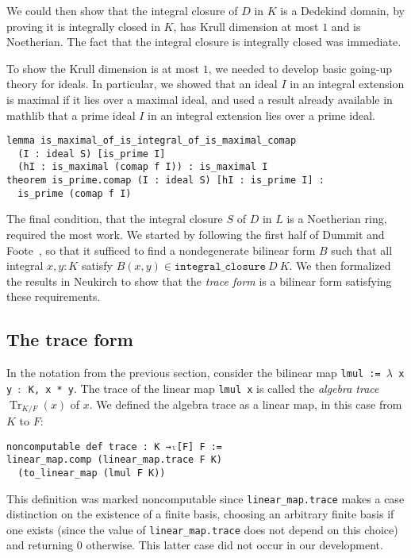 \documentclass[sn-mathphys]{sn-jnl}%
\newcommand{\lean}[1]{\texttt{#1}\xspace}
\DeclareMathOperator{\Tr}{Tr}
\newcommand{\mathlib}{\textsf{mathlib}\xspace}
\begin{document}
We could then show that the integral closure of $D$ in $K$ is a Dedekind domain,
by proving it is integrally closed in $K$, has Krull dimension at most $1$ and is Noetherian.
The fact that the integral closure is integrally closed was immediate.

To show the Krull dimension is at most $1$, we needed to develop basic going-up theory for ideals.
In particular, we showed that an ideal $I$ in an integral extension is maximal if it lies over a maximal ideal,
and used a result already available in \mathlib that a prime ideal $I$ in an integral extension lies over a prime ideal.
\begin{lstlisting}
lemma is_maximal_of_is_integral_of_is_maximal_comap
  (I : ideal S) [is_prime I]
  (hI : is_maximal (comap f I)) : is_maximal I
theorem is_prime.comap (I : ideal S) [hI : is_prime I] :
  is_prime (comap f I)
\end{lstlisting}

The final condition, that the integral closure $S$ of $D$ in $L$ is a Noetherian ring, required the most work.
We started by following the first half of Dummit and Foote~\cite[Theorem~15.29]{Dummit-and-Foote},
so that it sufficed to find a nondegenerate bilinear form $B$ such that all integral $x, y : K$ satisfy $B(x, y) \in \lean{integral\_closure}\ D\ K$.
We then formalized the results in Neukirch \cite[Sections~2.5--2.8]{Neukirch} to show that the \emph{trace form} is a bilinear form satisfying these requirements.

\subsection{The trace form}\label{sec:trace-form}
In the notation from the previous section, consider the bilinear map \lean{lmul := $\lambda$ x y $:$ K, x~*~y}.
The trace of the linear map \lean{lmul x} is called the \emph{algebra trace} $\Tr_{K / F}(x)$ of $x$.
We defined the algebra trace
as a linear map, in this case from $K$ to $F$:
\begin{lstlisting}
noncomputable def trace : K →ₗ[F] F :=
linear_map.comp (linear_map.trace F K)
  (to_linear_map (lmul F K))
\end{lstlisting}
This definition was marked noncomputable since \lean{linear\_map.trace} makes a case distinction on the existence of a finite basis,
choosing an arbitrary finite basis if one exists (since the value of \lean{linear\_map.trace} does not depend on this choice)
and returning $0$ otherwise.
This latter case did not occur in our development.
\end{document}
